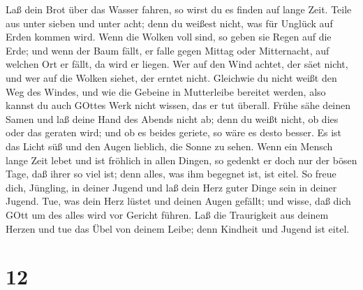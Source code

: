  Laß dein Brot über das Wasser fahren, so wirst du es finden
auf lange Zeit.  Teile aus unter sieben und unter acht; denn
du weißest nicht, was für Unglück auf Erden kommen wird. 
Wenn die Wolken voll sind, so geben sie Regen auf die Erde; und wenn der
Baum fällt, er falle gegen Mittag oder Mitternacht, auf welchen Ort er
fällt, da wird er liegen.  Wer auf den Wind achtet, der säet
nicht, und wer auf die Wolken siehet, der erntet nicht. 
Gleichwie du nicht weißt den Weg des Windes, und wie die Gebeine in
Mutterleibe bereitet werden, also kannst du auch GOttes Werk nicht
wissen, das er tut überall.  Frühe sähe deinen Samen und laß
deine Hand des Abends nicht ab; denn du weißt nicht, ob dies oder das
geraten wird; und ob es beides geriete, so wäre es desto besser.
 Es ist das Licht süß und den Augen lieblich, die Sonne zu
sehen.  Wenn ein Mensch lange Zeit lebet und ist fröhlich in
allen Dingen, so gedenkt er doch nur der bösen Tage, daß ihrer so viel
ist; denn alles, was ihm begegnet ist, ist eitel.  So freue
dich, Jüngling, in deiner Jugend und laß dein Herz guter Dinge sein in
deiner Jugend. Tue, was dein Herz lüstet und deinen Augen gefällt; und
wisse, daß dich GOtt um des alles wird vor Gericht führen. 
Laß die Traurigkeit aus deinem Herzen und tue das Übel von deinem Leibe;
denn Kindheit und Jugend ist eitel.

\hypertarget{section-11}{%
\section{12}\label{section-11}}

